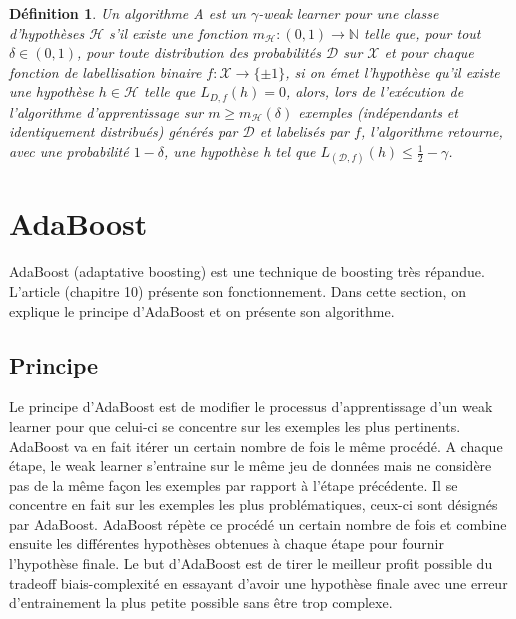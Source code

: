 \documentclass[12pt]{article}
\newtheorem{definition}{Définition}
\begin{document}
	\begin{definition} Un algorithme \textit{A} est un $\gamma$-weak learner pour une classe
		d'hypothèses $\mathcal{H}$ s'il existe une fonction $m_{\mathcal{H}}: (0,1) \rightarrow
		\mathbb{N}$ telle que, pour tout $\delta \in (0,1)$, pour toute distribution des probabilités
		$\mathcal{D}$ sur $\mathcal{X}$ et pour chaque fonction de labellisation binaire $f:\mathcal{X}
		\rightarrow \{\pm 1\}$, si on émet l'hypothèse qu'il existe une hypothèse $h \in \mathcal H$
		telle que $L_{D,f}(h)=0$, alors, lors de l'exécution de l'algorithme d'apprentissage sur
		$m \geq m_{\mathcal{H}}(\delta)$ exemples (indépendants et identiquement distribués) générés
		par $\mathcal{D}$ et labelisés par $f$, l'algorithme retourne, avec une probabilité
		$1- \delta$, une hypothèse \textit{h} tel que $L_{(\mathcal{D}, f)}(h) \leq \frac{1}{2} - \gamma$.
		\label{def:weaklearner}
	\end{definition}
	
	\renewcommand{\labelitemi}{$\bullet$}
	\section{AdaBoost}
	
	AdaBoost (adaptative boosting) est une technique de boosting très répandue. L'article \cite{Bousquet2003-oz} (chapitre 10) présente son fonctionnement. Dans cette section, on explique le principe d'AdaBoost et on présente son algorithme.  
	
	\subsection{Principe}
	
	Le principe d'AdaBoost est de modifier le processus d'apprentissage d'un weak learner pour que celui-ci se concentre sur les exemples les plus pertinents. AdaBoost va en fait itérer un certain nombre de fois le même procédé. A chaque étape, le weak learner s'entraine sur le même jeu de données mais ne considère pas de la même façon les exemples par rapport à l'étape précédente. Il se concentre en fait sur les exemples les plus problématiques, ceux-ci sont désignés par AdaBoost. AdaBoost répète ce procédé un certain nombre de fois et combine ensuite les différentes hypothèses obtenues à chaque étape pour fournir l'hypothèse finale. Le but d'AdaBoost est de tirer le meilleur profit possible du tradeoff biais-complexité en essayant d'avoir une hypothèse finale avec une erreur d'entrainement la plus petite possible sans être trop complexe.
	
\end{document}
